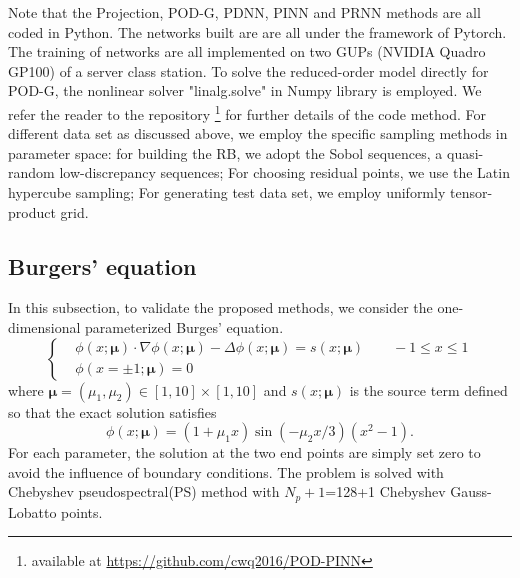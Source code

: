 \documentclass[preprint, 10pt]{elsarticle}
\begin{document}
Note that the Projection, POD-G, PDNN, PINN and PRNN methods are all coded in Python. The networks built are are all under the framework of Pytorch. The training of networks are all  implemented on two GUPs (NVIDIA Quadro GP100) of a server class station. To solve the reduced-order model directly for POD-G, the nonlinear solver "linalg.solve" in  Numpy library is employed. We refer the reader to the repository \footnote{available at \url{https://github.com/cwq2016/POD-PINN}} for further details of the code method. For different data set as discussed above, we employ the specific sampling methods in parameter space: for building the RB, we adopt the Sobol sequences, a quasi-random low-discrepancy sequences; For choosing residual points, we use the Latin hypercube sampling; For generating test data set, we employ uniformly tensor-product grid.


\subsection{Burgers' equation}
In this subsection, to validate the proposed methods, we consider the one-dimensional parameterized Burges' equation.
\begin{equation}
\left\{
\begin{aligned}
	 &\phi(x;\pmb{\mu}) \cdot \nabla \phi(x;\pmb{\mu}) -  \Delta \phi(x;\pmb{\mu})= s(x;\pmb{\mu})  \qquad -1 \le x \le 1\\
	 &\phi\left ( x= \pm1; \pmb {\mu} \right ) = 0
\end{aligned}\right.
\end{equation}
where $\pmb{\mu} =(\mu_1, \mu_2) \in [1,10] \times [1,10]$ and $s(x;\pmb{\mu})$ is the source term defined so that the exact solution satisfies
\begin{equation}
	\phi(x; \pmb{\mu}) = (1+\mu_1 x)\sin(-\mu_2 x/3) (x^2-1) .
\end{equation}
For each parameter, the solution at the two end points are simply set zero to avoid the influence of boundary conditions. The problem is solved with Chebyshev pseudospectral(PS) method with $N_p+1$=128+1 Chebyshev Gauss-Lobatto points.
\end{document}
